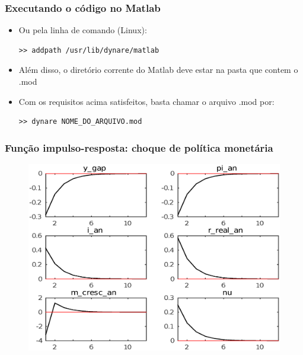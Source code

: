\documentclass[xcolor=pdftex,dvipsnames,table]{beamer}
\newcommand{\ft}{\frametitle}
\begin{document}

\begin{frame}[fragile]
\ft{Executando o código no Matlab}

\begin{itemize}
\item Ou pela linha de comando (Linux):

\begin{lstlisting}
>> addpath /usr/lib/dynare/matlab
\end{lstlisting}

\item Além disso, o diretório corrente do Matlab deve estar na pasta que contem o .mod

\item Com os requisitos acima satisfeitos, basta chamar o arquivo .mod por:


\begin{lstlisting}
>> dynare NOME_DO_ARQUIVO.mod
\end{lstlisting}


\end{itemize}
\end{frame}


\begin{frame}
\ft{Função impulso-resposta: choque de política monetária}

\begin{figure}[h!]
\includegraphics[scale=0.35]{fig31.eps}
\label{fig1}
\end{figure}


\end{frame}
\end{document}
